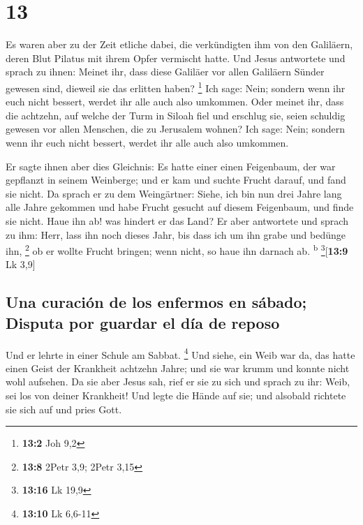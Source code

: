 \hypertarget{section-12}{%
\section{13}\label{section-12}}

 Es waren aber zu der Zeit etliche dabei, die verkündigten
ihm von den Galiläern, deren Blut Pilatus mit ihrem Opfer vermischt
hatte.  Und Jesus antwortete und sprach zu ihnen: Meinet
ihr, dass diese Galiläer vor allen Galiläern Sünder gewesen sind,
dieweil sie das erlitten haben? \footnote{\textbf{13:2} Joh 9,2}
 Ich sage: Nein; sondern wenn ihr euch nicht bessert,
werdet ihr alle auch also umkommen.  Oder meinet ihr, dass
die achtzehn, auf welche der Turm in Siloah fiel und erschlug sie, seien
schuldig gewesen vor allen Menschen, die zu Jerusalem wohnen?
 Ich sage: Nein; sondern wenn ihr euch nicht bessert,
werdet ihr alle auch also umkommen.

 Er sagte ihnen aber dies Gleichnis: Es hatte einer einen
Feigenbaum, der war gepflanzt in seinem Weinberge; und er kam und suchte
Frucht darauf, und fand sie nicht.  Da sprach er zu dem
Weingärtner: Siehe, ich bin nun drei Jahre lang alle Jahre gekommen und
habe Frucht gesucht auf diesem Feigenbaum, und finde sie nicht. Haue ihn
ab! was hindert er das Land?  Er aber antwortete und
sprach zu ihm: Herr, lass ihn noch dieses Jahr, bis dass ich um ihn
grabe und bedünge ihn, \footnote{\textbf{13:8} 2Petr 3,9; 2Petr 3,15}
 ob er wollte Frucht bringen; wenn nicht, so haue ihn
darnach ab. \textsuperscript{b} \footnote{\textbf{13:16} Lk 19,9}{[}\textbf{13:9}
Lk 3,9{]}

\hypertarget{una-curaciuxf3n-de-los-enfermos-en-suxe1bado-disputa-por-guardar-el-duxeda-de-reposo}{%
\subsection{Una curación de los enfermos en sábado; Disputa por guardar
el día de
reposo}\label{una-curaciuxf3n-de-los-enfermos-en-suxe1bado-disputa-por-guardar-el-duxeda-de-reposo}}

 Und er lehrte in einer Schule am Sabbat. \footnote{\textbf{13:10}
  Lk 6,6-11}  Und siehe, ein Weib war da, das hatte einen
Geist der Krankheit achtzehn Jahre; und sie war krumm und konnte nicht
wohl aufsehen.  Da sie aber Jesus sah, rief er sie zu
sich und sprach zu ihr: Weib, sei los von deiner Krankheit!
 Und legte die Hände auf sie; und alsobald richtete sie
sich auf und pries Gott.

